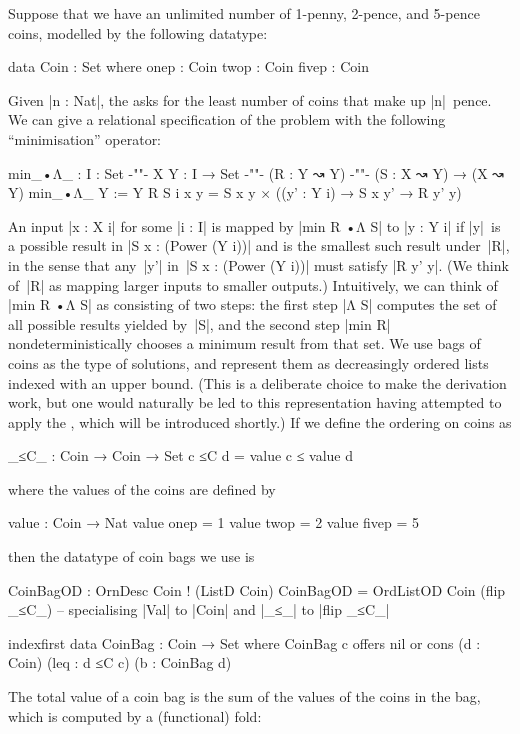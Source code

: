Suppose that we have an unlimited number of 1-penny, 2-pence, and 5-pence coins, modelled by the following datatype:
\begin{code}
data Coin : Set where
  onep   : Coin
  twop   : Coin
  fivep  : Coin
\end{code}
Given |n : Nat|, the  asks for the least number of coins that make up |n|~pence.
We can give a relational specification of the problem with the following ``minimisation'' operator:
\begin{code}
min_•Λ_ : {I : Set} {-"\kern-1pt"-} {X Y : I → Set} {-"\kern-1pt"-} (R : Y ↝ Y) {-"\kern-1pt"-} (S : X ↝ Y) → (X ↝ Y)
min_•Λ_ {Y := Y} R S {i} x y = S x y × ((y' : Y i) → S x y' → R y' y)
\end{code}
An input |x : X i| for some |i : I| is mapped by |min R •Λ S| to |y : Y i| if |y|~is a possible result in |S x : (Power (Y i))| and is the smallest such result under~|R|, in the sense that any~|y'| in~|S x : (Power (Y i))| must satisfy |R y' y|.
(We think of~|R| as mapping larger inputs to smaller outputs.)
Intuitively, we can think of |min R •Λ S| as consisting of two steps: the first step |Λ S| computes the set of all possible results yielded by~|S|, and the second step |min R| nondeterministically chooses a minimum result from that set.
We use bags of coins as the type of solutions, and represent them as decreasingly ordered lists indexed with an upper bound.
(This is a deliberate choice to make the derivation work, but one would naturally be led to this representation having attempted to apply the , which will be introduced shortly.)
If we define the ordering on coins as
\begin{code}
_≤C_ : Coin → Coin → Set
c ≤C d = value c ≤ value d
\end{code}
where the values of the coins are defined by
\begin{code}
value : Coin → Nat
value  onep   =  1
value  twop   =  2
value  fivep  =  5
\end{code}
then the datatype of coin bags we use is
\begin{code}
CoinBagOD : OrnDesc Coin ! (ListD Coin)
CoinBagOD = OrdListOD Coin (flip _≤C_)
-- specialising |Val| to |Coin| and |_≤_| to |flip _≤C_|

indexfirst data CoinBag : Coin → Set where
  CoinBag c  offers  nil
             or      cons  (d : Coin) (leq : d ≤C c) (b : CoinBag d)
\end{code}
The total value of a coin bag is the sum of the values of the coins in the bag, which is computed by a (functional) fold:
